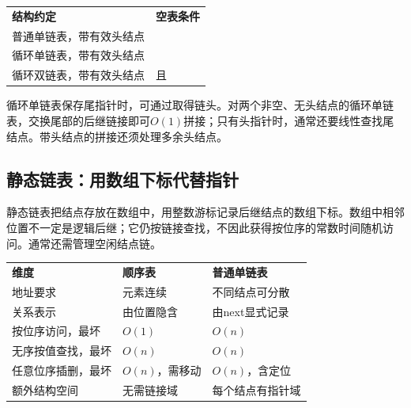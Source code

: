 \hypertarget{ds2-empty}{}

\par\smallskip\noindent\begin{tabularx}{\linewidth}{@{}YY@{}}\toprule
{} \textbf{结构约定} & \textbf{空表条件} \\
普通单链表，带有效头结点 &  \\
循环单链表，带有效头结点 &  \\
循环双链表，带有效头结点 & 且 \\\bottomrule\end{tabularx}\par\smallskip

\hypertarget{ds2-pointer-address}{}


\hypertarget{ds2-tail-circle}{}

循环单链表保存尾指针时，可通过取得链头。对两个非空、无头结点的循环单链表，交换尾部的后继链接即可$O(1)$拼接；只有头指针时，通常还要线性查找尾结点。带头结点的拼接还须处理多余头结点。


\hypertarget{ds2-static}{}

\subsection{静态链表：用数组下标代替指针}\label{ds2-static}

\hypertarget{ds2-static-text}{}

静态链表把结点存放在数组中，用整数游标记录后继结点的数组下标。数组中相邻位置不一定是逻辑后继；它仍按链接查找，不因此获得按位序的常数时间随机访问。通常还需管理空闲结点链。


\hypertarget{ds2-compare}{}

\par\smallskip\noindent\begin{tabularx}{\linewidth}{@{}YYY@{}}\toprule
{} \textbf{维度} & \textbf{顺序表} & \textbf{普通单链表} \\
地址要求 & 元素连续 & 不同结点可分散 \\
关系表示 & 由位置隐含 & 由next显式记录 \\
按位序访问，最坏 & $O(1)$ & $O(n)$ \\
无序按值查找，最坏 & $O(n)$ & $O(n)$ \\
任意位序插删，最坏 & $O(n)$，需移动 & $O(n)$，含定位 \\
额外结构空间 & 无需链接域 & 每个结点有指针域 \\\bottomrule\end{tabularx}\par\smallskip

